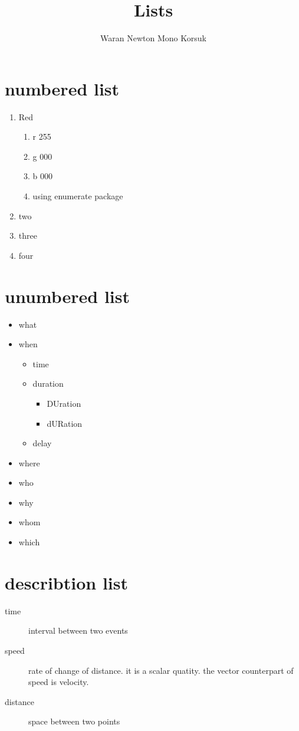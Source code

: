 \documentclass[12pt]{article}
\title{Lists}
\author{Waran Newton Mono Korsuk}
\renewcommand{\labelenumi}{\alph{enumi}.}
\begin{document}
\tableofcontents
	\maketitle
	\section{numbered list}
	\begin{enumerate}
		\renewcommand{\labelenumi}{Alt. \arabic{enumi})}
		\setlength{\itemsep}{.5cm}

		\item Red
			\begin{enumerate}[{\bf Qt a.}]
				\item r 255
				\item g 000
				\item b 000
				\item using enumerate package
			\end{enumerate}
		\item two
		\item three
		\item four
	\end{enumerate}

	\section{unumbered list}
	\begin{itemize}
	\renewcommand*\labelitemii{*}
	\renewcommand*\labelitemiii{$\infty$}
		\item what
		\item when
		\begin{itemize}
			\item time
			\item duration
			\begin{itemize}
				\item DUration
				\item dURation
			\end{itemize}
			\item delay
		\end{itemize}
		\item where
		\item who
		\item why
		\item whom
		\item which
	\end{itemize}

	\section{describtion list}
	\begin{description}
		\item[time] interval between two events
		\item[speed] rate of change of distance. it is a scalar quatity. the vector counterpart of speed is velocity.
		\item[distance] space between two points
	\end{description}
\end{document}
